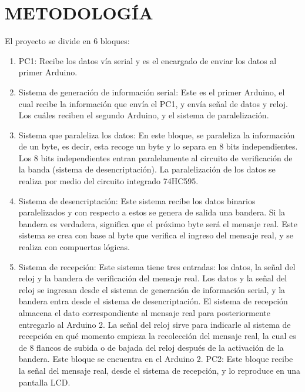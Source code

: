 \documentclass{article}
\begin{document}
\section{METODOLOGÍA}

El proyecto se divide en 6 bloques:

\begin{enumerate}
\item PC1: Recibe los datos vía serial y es el encargado de enviar los datos al primer Arduino.

\item Sistema de generación de información serial:  Este es el primer Arduino, el cual recibe la información que envía el PC1, y envía señal de datos y reloj. Los cuáles reciben el segundo Arduino, y el sistema de paralelización.

\item Sistema que paraleliza los datos:  En este bloque, se paraleliza la información de un byte, es decir, esta recoge un byte y lo separa en 8 bits independientes. Los 8 bits independientes entran paralelamente al circuito de verificación de la banda (sistema de desencriptación). La paralelización de los datos se realiza por medio del circuito integrado 74HC595.

\item Sistema de desencriptación: Este sistema recibe los datos binarios paralelizados y con respecto a estos se genera de salida una bandera. Si la bandera es verdadera, significa que el próximo byte será el mensaje real. Este sistema se crea con base al byte que verifica el ingreso del mensaje real, y se realiza con compuertas lógicas.

\item Sistema de recepción: Este sistema tiene tres entradas: los datos, la señal del reloj y la bandera de verificación del mensaje real. Los datos y la señal del reloj se ingresan desde el sistema de generación de información serial, y la bandera entra desde el sistema de desencriptación. El sistema de recepción almacena el dato correspondiente al mensaje real para posteriormente entregarlo al Arduino 2. La señal del reloj sirve para indicarle al sistema de recepción en qué momento empieza la recolección del mensaje real, la cual es de 8 flancos de subida o de bajada del reloj después de la activación de la bandera. Este bloque se encuentra en el Arduino 2.
PC2: Este bloque recibe la señal del mensaje real, desde el sistema de recepción, y lo reproduce en una pantalla LCD.

\end{enumerate}
\end{document}
